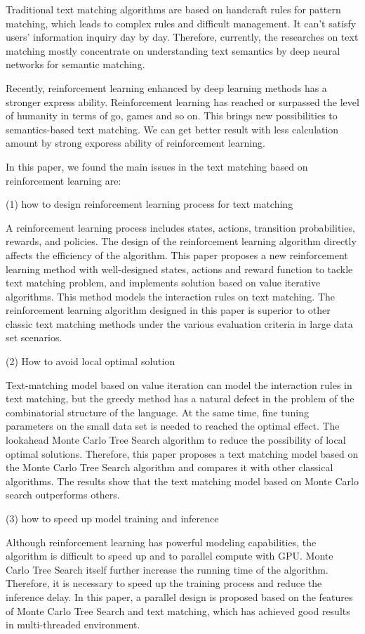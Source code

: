 Traditional text matching algorithms are based on handcraft rules for pattern matching, which leads to complex rules and difficult management. It can’t satisfy users’ information inquiry day by day. Therefore, currently, the researches on text matching mostly concentrate on understanding text semantics by deep neural networks for semantic matching.

Recently, reinforcement learning enhanced by deep learning methods has a stronger express ability. Reinforcement learning has reached or surpassed the level of humanity in terms of go, games and so on. This brings new possibilities to semantics-based text matching. We can get better result with less calculation amount by strong exporess ability of reinforcement learning.

In this paper, we found the main issues in the text matching based on reinforcement learning are:

(1) how to design reinforcement learning process for text matching

A reinforcement learning process includes states, actions, transition probabilities, rewards, and policies. The design of the reinforcement learning algorithm directly affects the efficiency of the algorithm. This paper proposes a new reinforcement learning method with well-designed states, actions and reward function to tackle text matching problem, and implements solution based on value iterative algorithms. This method models the interaction rules on text matching. The reinforcement learning algorithm designed in this paper is superior to other classic text matching methods under the various evaluation criteria in large data set scenarios.

(2) How to avoid local optimal solution

Text-matching model based on value iteration can model the interaction rules in text matching, but the greedy method has a natural defect in the problem of the combinatorial structure of the language. At the same time, fine tuning parameters on the small data set is needed to reached the optimal effect. The lookahead Monte Carlo Tree Search algorithm to reduce the possibility of local optimal solutions. Therefore, this paper proposes a text matching model based on the Monte Carlo Tree Search algorithm and compares it with other classical algorithms. The results show that the text matching model based on Monte Carlo search outperforms others.

(3) how to speed up model training and inference

Although reinforcement learning has powerful modeling capabilities, the algorithm is difficult to speed up and to parallel compute with GPU. Monte Carlo Tree Search itself further increase the running time of the algorithm. Therefore, it is necessary to speed up the training process and reduce the inference delay. In this paper, a parallel design is proposed based on the features of Monte Carlo Tree Search and text matching, which has achieved good results in multi-threaded environment.


